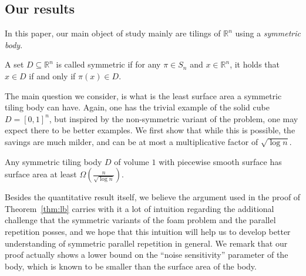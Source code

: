 












































\setcounter{thm}{3}\setcounter{subsection}{2}\subsection{Our results}
In this paper, our main object of study mainly are tilings of $\mathbb{R}^n$ using a \emph{symmetric body}.
\begin{definition}
  A set $D\subseteq\mathbb{R}^n$ is called symmetric if
  for any $\pi\in S_n$ and $x\in\mathbb{R}^n$, it holds that
  $x\in D$ if and only if $\pi(x)\in D$.
\end{definition}

The main question we consider, is what is the least surface area a symmetric tiling body can have.
Again, one has the trivial example of the solid cube $D = [0,1]^n$, but inspired by the non-symmetric
variant of the problem, one may expect there to be better examples. We first show that while this is
possible, the savings are much milder, and can be at most a multiplicative factor of $\sqrt{\log n}$.
\begin{thm}\label{thm:lb}
	Any symmetric tiling body $D$ of volume $1$
	with piecewise smooth surface has surface area at least $\Omega\left(\frac{n}{\sqrt{\log n}}\right)$.
\end{thm}

Besides the quantitative result itself, we believe the argument used in the proof of Theorem~\ref{thm:lb}
carries with it a lot of intuition regarding the additional challenge that the symmetric variants of the foam problem
and the parallel repetition posses, and we hope that this intuition will help us to develop better understanding
of symmetric parallel repetition in general. We remark that our proof actually shows a lower bound on the ``noise sensitivity''
parameter of the body, which is known to be smaller than the surface area of the body.

